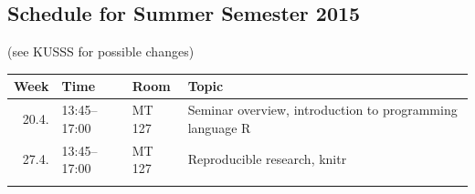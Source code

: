 \documentclass[]{article}
\begin{document}
\subsection{Schedule for Summer Semester
2015}\label{schedule-for-summer-semester-2015}

(see KUSSS for possible changes)

\begin{longtable}[c]{@{}rlll@{}}
\toprule
\begin{minipage}[b]{0.09\columnwidth}\raggedleft\strut
Week
\strut\end{minipage} &
\begin{minipage}[b]{0.15\columnwidth}\raggedright\strut
Time
\strut\end{minipage} &
\begin{minipage}[b]{0.13\columnwidth}\raggedright\strut
Room
\strut\end{minipage} &
\begin{minipage}[b]{0.51\columnwidth}\raggedright\strut
Topic
\strut\end{minipage}\tabularnewline
\midrule
\endhead
\begin{minipage}[t]{0.09\columnwidth}\raggedleft\strut
20.4.
\strut\end{minipage} &
\begin{minipage}[t]{0.15\columnwidth}\raggedright\strut
13:45--17:00
\strut\end{minipage} &
\begin{minipage}[t]{0.13\columnwidth}\raggedright\strut
MT 127
\strut\end{minipage} &
\begin{minipage}[t]{0.51\columnwidth}\raggedright\strut
Seminar overview, introduction to programming language R
\strut\end{minipage}\tabularnewline
\begin{minipage}[t]{0.09\columnwidth}\raggedleft\strut
27.4.
\strut\end{minipage} &
\begin{minipage}[t]{0.15\columnwidth}\raggedright\strut
13:45--17:00
\strut\end{minipage} &
\begin{minipage}[t]{0.13\columnwidth}\raggedright\strut
MT 127
\strut\end{minipage} &
\begin{minipage}[t]{0.51\columnwidth}\raggedright\strut
Reproducible research, knitr
\strut\end{minipage}\tabularnewline
\begin{minipage}[t]{0.09\columnwidth}\raggedleft\strut

\end{minipage}
\end{longtable}
\end{document}
